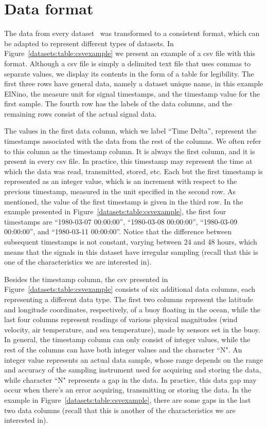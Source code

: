 
\clearpage
\section{Data format}
\label{datasets:over}


The data from every dataset \dataCite\ was transformed to a consistent format, which can be adapted to represent different types of datasets. In Figure~\ref{datasets:table:csvexample} we present an example of a csv file with this format. Although a csv file is simply a delimited text file that uses commas to separate values, we display its contents in the form of a table for legibility. The first three rows have general data, namely a dataset unique name, in this example ElNino, the measure unit for signal timestamps, and the timestamp value for the first sample. The fourth row has the labels of the data columns, and the remaining rows consist of the actual signal data.





\vspace{-5pt}
The values in the first data column, which we label ``Time Delta'', represent the timestamps associated with the data from the rest of the columns. We often refer to this column as the timestamp column. It is always the first column, and it is present in every csv file. In practice, this timestamp may represent the time at which the data was read, transmitted, stored, etc. Each but the first timestamp is represented as an integer value, which is an increment with respect to the previous timestamp, measured in the unit specified in the second row. As mentioned, the value of the first timestamp is given in the third row. In the example presented in Figure~\ref{datasets:table:csvexample}, the first four timestamps are ``1980-03-07 00:00:00'', ``1980-03-08 00:00:00'', ``1980-03-09 00:00:00'', and ``1980-03-11 00:00:00''. Notice that the difference between subsequent timestamps is not constant, varying between 24 and 48 hours, which means that the signals in this dataset have irregular sampling (recall that this is one of the characteristics we are interested in).


Besides the timestamp column, the csv presented in Figure~\ref{datasets:table:csvexample} consists of six additional data columns, each representing a different data type. The first two columns represent the latitude and longitude coordinates, respectively, of a buoy floating in the ocean, while the last four columns represent readings of various physical magnitudes (wind velocity, air temperature, and sea temperature), made by sensors set in the buoy. In general, the timestamp column can only consist of integer values, while the rest of the columns can have both integer values and the character ``N". An integer value represents an actual data sample, whose range depends on the range and accuracy of the sampling instrument used for acquiring and storing the data, while character ``N" represents a gap in the data. In practice, this data gap may occur when there's an error acquiring, transmitting or storing the data. In the example in Figure~\ref{datasets:table:csvexample}, there are some gaps in the last two data columns (recall that this is another of the characteristics we are interested in).

